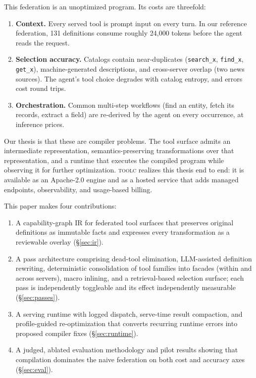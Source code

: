 \documentclass[11pt]{article}
\begin{document}
This federation is an unoptimized program. Its costs are threefold:

\begin{enumerate}
\item \textbf{Context.} Every served tool is prompt input on every
turn. In our reference federation, 131 definitions consume roughly 24{,}000
tokens before the agent reads the request.
\item \textbf{Selection accuracy.} Catalogs contain near-duplicates
(\texttt{search\_x}, \texttt{find\_x}, \texttt{get\_x}), machine-generated
descriptions, and cross-server overlap (two news sources). The agent's tool
choice degrades with catalog entropy, and errors cost round trips.
\item \textbf{Orchestration.} Common multi-step workflows (find an entity,
fetch its records, extract a field) are re-derived by the agent on every
occurrence, at inference prices.
\end{enumerate}

Our thesis is that these are compiler problems. The tool surface admits an
intermediate representation, semantics-preserving transformations over that
representation, and a runtime that executes the compiled program while
observing it for further optimization. \textsc{toolc} realizes this thesis
end to end: it is available as an Apache-2.0 engine and as a hosted service
that adds managed endpoints, observability, and usage-based billing.

This paper makes four contributions:
\begin{enumerate}
\item A capability-graph IR for federated tool surfaces that preserves
original definitions as immutable facts and expresses every transformation as
a reviewable overlay (\S\ref{sec:ir}).
\item A pass architecture comprising dead-tool elimination, LLM-assisted definition
rewriting, deterministic consolidation of tool families into facades (within
and across servers), macro inlining, and a retrieval-based selection surface;
each pass is independently toggleable and its effect independently measurable
(\S\ref{sec:passes}).
\item A serving runtime with logged dispatch, serve-time result compaction,
and profile-guided re-optimization that converts recurring runtime errors into
proposed compiler fixes (\S\ref{sec:runtime}).
\item A judged, ablated evaluation methodology and pilot results showing that
compilation dominates the naive federation on both cost and accuracy axes
(\S\ref{sec:eval}).
\end{enumerate}
\end{document}
